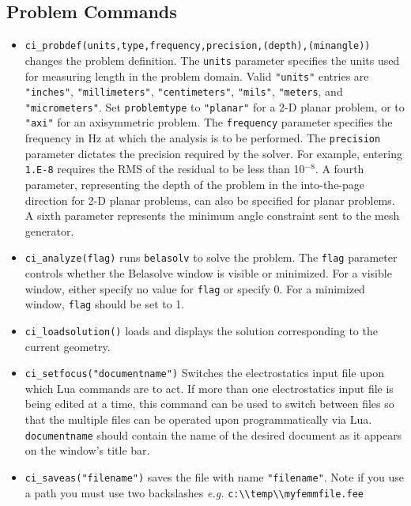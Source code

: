 \subsection{Problem Commands}

\begin{itemize}
\item {\tt ci\_probdef(units,type,frequency,precision,(depth),(minangle))} changes the problem
definition. The \texttt{units} parameter specifies the units used
for measuring length in the problem domain. Valid \texttt{"units"}
entries are
\texttt{"inches"}, \texttt{"millimeters"}, \texttt{"centimeters"},
\texttt{"mils"}, \texttt{"meters}, and \texttt{"micrometers"}. Set
\texttt{problemtype} to \texttt{"planar"} for a 2-D planar problem, or to
\texttt{"axi"} for an axisymmetric problem. The \texttt{frequency} parameter specifies the frequency
in Hz at which the analysis is to be performed. The \texttt{precision} parameter
dictates the precision required by the solver. For example, entering
\texttt{1.E-8} requires the RMS of the residual to be less than 10$^{ - 8}$.
A fourth parameter, representing the depth of the problem in the
into-the-page direction for 2-D planar problems, can also be specified
for planar problems. A sixth parameter represents the minimum angle constraint sent to the mesh generator.

\item {\tt ci\_analyze(flag)} runs \texttt{belasolv} to solve the problem. The
\texttt{flag} parameter controls whether the Belasolve window is visible or
minimized. For a visible window, either specify no value for
\texttt{flag} or specify 0. For a minimized window, \texttt{flag}
should be set to 1.

\item {\tt ci\_loadsolution()} loads and displays the solution corresponding to the
current geometry.

\item {\tt ci\_setfocus("documentname")} Switches the
electrostatics input file upon which Lua commands are to act. If
more than one electrostatics input file is being edited at a time,
this command can be used to switch between files so that the
multiple files can be operated upon programmatically via Lua. {\tt
documentname} should contain the name of the desired document as
it appears on the window's title bar.

\item {\tt ci\_saveas("filename")} saves the file with name
\texttt{"filename"}. Note if you use a path you must use two backslashes
{\em e.g.} \verb+c:\\temp\\myfemmfile.fee+

\end{itemize}

